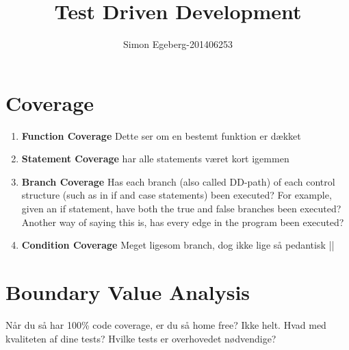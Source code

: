 \documentclass{article}
\title{Test Driven Development}
\author{Simon Egeberg-201406253}
\begin{document}
\maketitle
\section{Coverage}
\begin{enumerate}
	\item \textbf{Function Coverage} Dette ser om en bestemt funktion er dækket
	\item \textbf{Statement Coverage} har alle statements været kort igemmen
	\item \textbf{Branch Coverage} Has each branch (also called DD-path) of each control structure (such as in if and case statements) been executed? For example, given an if statement, have both the true and false branches been executed? Another way of saying this is, has every edge in the program been executed?
	\item \textbf{Condition Coverage} Meget ligesom branch, dog ikke lige så pedantisk ||
\end{enumerate}
\section{Boundary Value Analysis}
Når du så har 100\% code coverage, er du så home free? Ikke helt. Hvad med kvaliteten af dine tests? Hvilke tests er overhovedet nødvendige?
\end{document}
